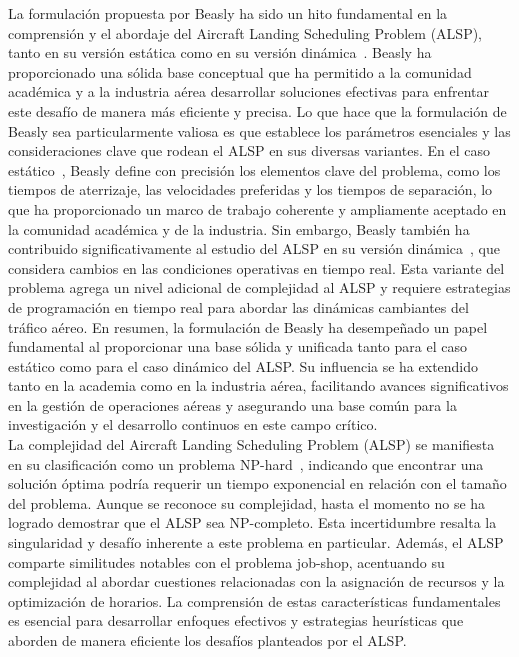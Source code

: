 \documentclass[letter, 10pt]{article}
\begin{document}
La formulaci\'on propuesta por Beasly ha sido un hito fundamental en la comprensi\'on y el abordaje del Aircraft Landing Scheduling Problem (ALSP), tanto en su versi\'on est\'atica como en su versi\'on din\'amica~\cite{Beasley2004}. Beasly ha proporcionado una s\'olida base conceptual que ha permitido a la comunidad acad\'emica y a la industria a\'erea desarrollar soluciones efectivas para enfrentar este desaf\'io de manera m\'as eficiente y precisa. Lo que hace que la formulaci\'on de Beasly sea particularmente valiosa es que establece los par\'ametros esenciales y las consideraciones clave que rodean el ALSP en sus diversas variantes. En el caso est\'atico~\cite{beasley1990scheduling}, Beasly define con precisi\'on los elementos clave del problema, como los tiempos de aterrizaje, las velocidades preferidas y los tiempos de separaci\'on, lo que ha proporcionado un marco de trabajo coherente y ampliamente aceptado en la comunidad acad\'emica y de la industria. Sin embargo, Beasly tambi\'en ha contribuido significativamente al estudio del ALSP en su versi\'on din\'amica~\cite{Beasley2004}, que considera cambios en las condiciones operativas en tiempo real. Esta variante del problema agrega un nivel adicional de complejidad al ALSP y requiere estrategias de programaci\'on en tiempo real para abordar las din\'amicas cambiantes del tr\'afico a\'ereo. En resumen, la formulaci\'on de Beasly ha desempe\~{n}ado un papel fundamental al proporcionar una base s\'olida y unificada tanto para el caso est\'atico como para el caso din\'amico del ALSP. Su influencia se ha extendido tanto en la academia como en la industria a\'erea, facilitando avances significativos en la gesti\'on de operaciones a\'ereas y asegurando una base com\'un para la investigaci\'on y el desarrollo continuos en este campo cr\'itico. \\

La complejidad del Aircraft Landing Scheduling Problem (ALSP) se manifiesta en su clasificaci\'on como un problema NP-hard~\cite{IKLI2021105336}, indicando que encontrar una soluci\'on \'optima podr\'ia requerir un tiempo exponencial en relaci\'on con el tama\~{n}o del problema. Aunque se reconoce su complejidad, hasta el momento no se ha logrado demostrar que el ALSP sea NP-completo. Esta incertidumbre resalta la singularidad y desaf\'io inherente a este problema en particular. Adem\'as, el ALSP comparte similitudes notables con el problema job-shop, acentuando su complejidad al abordar cuestiones relacionadas con la asignaci\'on de recursos y la optimizaci\'on de horarios. La comprensi\'on de estas caracter\'isticas fundamentales es esencial para desarrollar enfoques efectivos y estrategias heur\'isticas que aborden de manera eficiente los desaf\'ios planteados por el ALSP.
\end{document}
